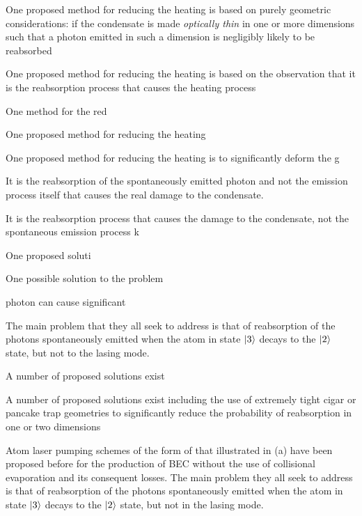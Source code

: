 One proposed method for reducing the heating is based on purely geometric considerations: if the condensate is made \emph{optically thin} in one or more dimensions such that a photon emitted in such a dimension is negligibly likely to be reabsorbed


One proposed method for reducing the heating is based on the observation that it is the reabsorption process that causes the heating process



One method for the red


One proposed method for reducing the heating 


One proposed method for reducing the heating is to significantly deform the g


It is the reabsorption of the spontaneously emitted photon and not the emission process itself that causes the real damage to the condensate.  


It is the reabsorption process that causes the damage to the condensate, not the spontaneous emission process k


One proposed soluti


One possible solution to the problem 



photon can cause significant


The main problem that they all seek to address is that of reabsorption of the photons spontaneously emitted when the atom in state ${\left|3\right>}$ decays to the ${\left|2\right>}$ state, but not to the lasing mode.  

A number of proposed solutions exist 

A number of proposed solutions exist including the use of extremely tight cigar or pancake trap geometries to significantly reduce the probability of reabsorption in one or two dimensions %




Atom laser pumping schemes of the form of that illustrated in (a) have been proposed before \citep{Olshanii:1996,Janicke:1996,Spreeuw:1995,Cirac:1996rr,Cirac:1996,Santos:2000,Castin:1998,Cirac:1994,Vengalattore:2003,Santos:2001ve,Wolf:2000} for the production of BEC without the use of collisional evaporation and its consequent losses.  The main problem they all seek to address is that of reabsorption of the photons spontaneously emitted when the atom in state ${\left|3\right>}$ decays to the ${\left|2\right>}$ state, but not in the lasing mode.  


